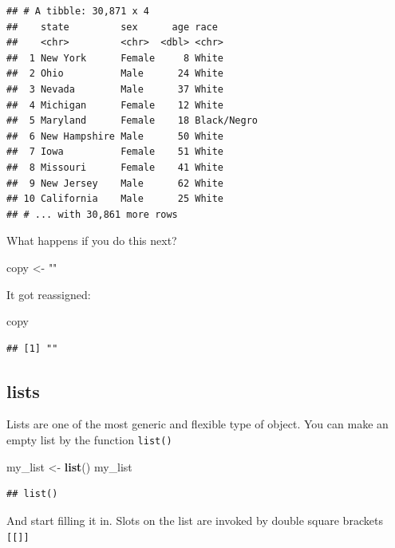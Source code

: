 \documentclass[
]{book}
\newenvironment{Shaded}{\begin{snugshade}}{\end{snugshade}}
\newcommand{\KeywordTok}[1]{\textcolor[rgb]{0.13,0.29,0.53}{\textbf{#1}}}
\newcommand{\NormalTok}[1]{#1}
\newcommand{\StringTok}[1]{\textcolor[rgb]{0.31,0.60,0.02}{#1}}
\theoremstyle{definition}
\theoremstyle{definition}
\theoremstyle{definition}
\theoremstyle{definition}
\theoremstyle{remark}
\begin{document}
\begin{verbatim}
## # A tibble: 30,871 x 4
##    state         sex      age race       
##    <chr>         <chr>  <dbl> <chr>      
##  1 New York      Female     8 White      
##  2 Ohio          Male      24 White      
##  3 Nevada        Male      37 White      
##  4 Michigan      Female    12 White      
##  5 Maryland      Female    18 Black/Negro
##  6 New Hampshire Male      50 White      
##  7 Iowa          Female    51 White      
##  8 Missouri      Female    41 White      
##  9 New Jersey    Male      62 White      
## 10 California    Male      25 White      
## # ... with 30,861 more rows
\end{verbatim}

What happens if you do this next?

\begin{Shaded}
\begin{Highlighting}[]
\NormalTok{copy <-}\StringTok{ ""}
\end{Highlighting}
\end{Shaded}

It got reassigned:

\begin{Shaded}
\begin{Highlighting}[]
\NormalTok{copy}
\end{Highlighting}
\end{Shaded}

\begin{verbatim}
## [1] ""
\end{verbatim}

\hypertarget{lists}{%
\subsection{lists}\label{lists}}

Lists are one of the most generic and flexible type of object. You can make an empty list by the function \texttt{list()}

\begin{Shaded}
\begin{Highlighting}[]
\NormalTok{my_list <-}\StringTok{ }\KeywordTok{list}\NormalTok{()}
\NormalTok{my_list}
\end{Highlighting}
\end{Shaded}

\begin{verbatim}
## list()
\end{verbatim}

And start filling it in. Slots on the list are invoked by double square brackets \texttt{{[}{[}{]}{]}}
\end{document}
